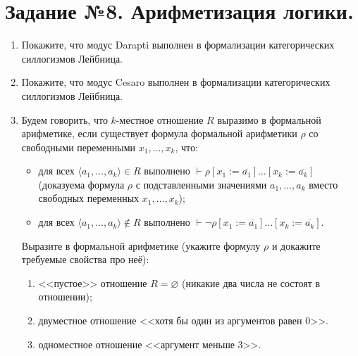 \documentclass[10pt,a4paper,oneside]{article}
\begin{document}
\section*{Задание №8. Арифметизация логики.}
\begin{enumerate}
\item Покажите, что модус Darapti выполнен в формализации категорических силлогизмов Лейбница.
\item Покажите, что модус Cesaro выполнен в формализации категорических силлогизмов Лейбница.
\item Будем говорить, что $k$-местное отношение $R$ выразимо в формальной арифметике,
если существует формула формальной арифметики $\rho$ со свободными переменными $x_1, \dots, x_k$, что:
\begin{itemize}
\item для всех $\langle a_1, \dots, a_k \rangle \in R$ выполнено $\vdash\rho[x_1 := \overline{a_1}]\dots[x_k := \overline{a_k}]$
(доказуема формула $\rho$ с подставленными значениями $a_1, \dots, a_k$ вместо свободных переменных $x_1, \dots, x_k$);
\item для всех $\langle a_1, \dots, a_k \rangle \notin R$ выполнено $\vdash\neg\rho[x_1 := \overline{a_1}]\dots[x_k := \overline{a_k}]$.
\end{itemize}

Выразите в формальной арифметике (укажите формулу $\rho$ и докажите требуемые свойства про неё):
\begin{enumerate}
\item <<пустое>> отношение $R = \varnothing$ (никакие два числа не состоят в отношении);
\item двуместное отношение <<хотя бы один из аргументов равен 0>>.
\item одноместное отношение <<аргумент меньше 3>>.
\end{enumerate}


\end{enumerate}
\end{document}
